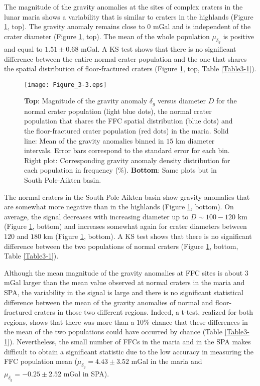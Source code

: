 The magnitude of the gravity anomalies at the sites of complex craters
in the lunar  maria shows a variability that is  similar to craters in
the  highlands (Figure  \ref{C6-Figure3-3},  top).   The gravity  anomaly
remains close  to $0$ mGal and  is independent of the  crater diameter
(Figure  \ref{C6-Figure3-3},  top).  The  mean  of  the whole  population
$\mu_{\delta_g}$ is positive and equal to  $1.51 \pm 0.68$ mGal.  A KS
test shows that there is  no significant difference between the entire
normal  crater  population  and  the   one  that  shares  the  spatial
distribution of floor-fractured  craters (Figure \ref{C6-Figure3-3}, top,
Table \ref{Table3-1}).
\begin{figure}[h!]
  \graphicspath{ {/Users/thorey/Documents/These/Projet/FFC/Gravi_GRAIL/Article/Papier/Proof/} }
  \begin{center}
    \texttt{[image: Figure\_3-3.eps]}
    \caption{\textbf{Top}: Magnitude of the gravity anomaly $\delta_g$
      versus diameter $D$ for the normal crater population (light blue
      dots), the normal crater population  that shares the FFC spatial
      distribution (blue dots)  and the  floor-fractured crater
      population (red dots) in the maria. Solid line: Mean of the
      gravity anomalies  binned in $15$ km  diameter intervals.  Error
      bars correspond to the standard error for each bin.  Right plot:
      Corresponding  gravity  anomaly  density distribution  for  each
      population in frequency ($\%$).  \textbf{Bottom}: Same plots but
      in South Pole-Aikten basin.}
    \label{C6-Figure3-3}
  \end{center}
\end{figure}

The  normal  craters in  the  South  Pole  Aikten basin  show  gravity
anomalies  that  are somewhat  more  negative  than in  the  highlands
(Figure \ref{C6-Figure3-3},  bottom).  On  average, the  signal decreases
with  increasing   diameter  up  to   $D  \sim  100-120$   km  (Figure
\ref{C6-Figure3-3},  bottom)  and  increases somewhat  again  for  crater
diameters between $120$ and $180$ km (Figure \ref{C6-Figure3-3}, bottom).
A KS  test shows that there  is no significant difference  between the
two  populations of  normal craters  (Figure \ref{C6-Figure3-3},  bottom,
Table \ref{Table3-1}).

Although the mean  magnitude of the gravity anomalies at  FFC sites is
about $3$ mGal  larger than the mean value observed  at normal craters
in the maria and SPA, the variability in the signal is large and there
is  no significant  statistical  difference between  the  mean of  the
gravity anomalies of  normal and floor-fractured craters  in those two
different regions.  Indeed, a t-test, realized for both regions, shows
that there was more than a $10\%$ chance that these differences in the
mean  of the  two populations  could  have occurred  by chance  (Table
\ref{Table3-1}).  Nevertheless, the small number  of FFCs in the maria
and in the  SPA makes difficult to obtain a  significant statistic due
to   the  low   accuracy  in   measuring  the   FFC  population   mean
($\mu_{\delta_g}   =4.43  \pm   3.52   $  mGal   in   the  maria   and
$\mu_{\delta_g} =-0.25\pm 2.52 $ mGal in SPA).


